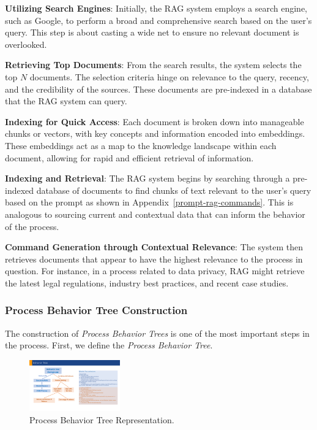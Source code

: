 \noindent
{\bf Utilizing Search Engines}: Initially, the RAG system employs a search engine, such as Google, to perform a broad and comprehensive search based on the user's query. This step is about casting a wide net to ensure no relevant document is overlooked.

\noindent
{\bf Retrieving Top Documents}: From the search results, the system selects the top $N$ documents. The selection criteria hinge on relevance to the query, recency, and the credibility of the sources. These documents are pre-indexed in a database that the RAG system can query.

\noindent
{\bf Indexing for Quick Access}: Each document is broken down into manageable chunks or vectors, with key concepts and information encoded into embeddings. These embeddings act as a map to the knowledge landscape within each document, allowing for rapid and efficient retrieval of information.

\noindent
{\bf Indexing and Retrieval}: The RAG system begins by searching through a pre-indexed database of documents to find chunks of text relevant to the user's query based on the prompt as shown in Appendix~\ref{prompt-rag-commands}. This is analogous to sourcing current and contextual data that can inform the behavior of the process.

\noindent
{\bf Command Generation through Contextual Relevance}: The system then retrieves documents that appear to have the highest relevance to the process in question. For instance, in a process related to data privacy, RAG might retrieve the latest legal regulations, industry best practices, and recent case studies.


\subsubsection{Process Behavior Tree Construction}
The construction of \textit{Process Behavior Trees} is one of the most important steps in the process.
First, we define the \textit{Process Behavior Tree}.
\begin{figure}[h]
    \centering
      \includegraphics[width=0.35\textwidth]{figs/tree1.pdf}
    \caption{Process Behavior Tree Representation.}
    \label{fig:BT}
\end{figure}

